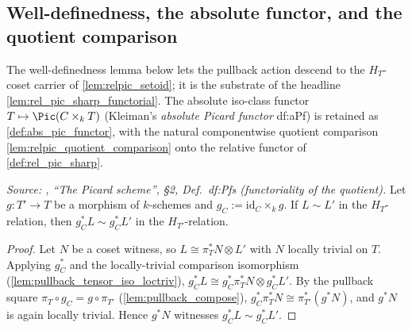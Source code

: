 \subsection{Well-definedness, the absolute functor, and the quotient comparison}
\label{subsec:relpic_relative_functor}


The well-definedness lemma below lets the pullback action descend to the
\(H_T\)-coset carrier of \cref{lem:relpic_setoid}; it is the substrate of
the headline \cref{lem:rel_pic_sharp_functorial}. The absolute iso-class
functor \(T \mapsto \Pic(C \times_k T)\) (Kleiman's \emph{absolute Picard
functor} df:aPf) is retained as \cref{def:abs_pic_functor}, with the
natural componentwise quotient comparison
\cref{lem:relpic_quotient_comparison} onto the relative functor of
\cref{def:rel_pic_sharp}.

\begin{lemma}\leanok
  \label{lem:relpic_pullback_welldef}
  \textit{Source: \cite{kleiman-picard}, ``The Picard scheme'', \S 2, Def.~df:Pfs
  (functoriality of the quotient).}
  Let \(g : T' \to T\) be a morphism of \(k\)-schemes and
  \(g_C := \mathrm{id}_C \times_k g\). If \(L \sim L'\) in the
  \(H_T\)-relation, then \(g_C^* L \sim g_C^* L'\) in the
  \(H_{T'}\)-relation.
\end{lemma}

\begin{proof}\leanok
  Let \(N\) be a coset witness, so \(L \cong \pi_T^* N \otimes L'\) with
  \(N\) locally trivial on \(T\). Applying \(g_C^*\) and the locally-trivial
  comparison isomorphism (\cref{lem:pullback_tensor_iso_loctriv}),
  \(g_C^* L \cong g_C^* \pi_T^* N \otimes g_C^* L'\). By the pullback square
  \(\pi_T \circ g_C = g \circ \pi_{T'}\) (\cref{lem:pullback_compose}),
  \(g_C^* \pi_T^* N \cong \pi_{T'}^* (g^* N)\), and \(g^* N\) is again
  locally trivial. Hence \(g^* N\) witnesses \(g_C^* L \sim g_C^* L'\).
\end{proof}

